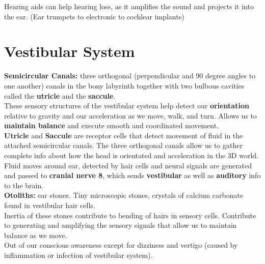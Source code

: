 \documentclass{article}
\begin{document}
Hearing aids can help hearing loss, as it amplifies the sound and projects it into the ear. (Ear trumpets to electronic to cochlear implants) \\ 

\newpage
\section{Vestibular System}

\textbf{Semicircular Canals:} three orthogonal (perpendicular and 90 degree angles to one another) canals in the bony labyrinth together with two bulbous cavities called the \textbf{utricle} and the \textbf{saccule}. \\

These sensory structures of the vestibular system help detect our \textbf{orientation} relative to gravity and our acceleration as we move, walk, and turn. Allows us to \textbf{maintain balance} and execute smooth and coordinated movement. \\

\noindent \textbf{Utricle} and \textbf{Saccule} are receptor cells that detect movement of fluid in the attached semicircular canals. The three orthogonal canals allow us to gather complete info about how the head is orientated and acceleration in the 3D world. Fluid moves around ear, detected by hair cells and neural signals are generated and passed to \textbf{cranial nerve 8}, which sends\textbf{ vestibular} as well as \textbf{auditory} info to the brain. \\

\noindent \textbf{Otoliths:} ear stones. Tiny microscopic stones, crystals of calcium carbonate found in vestibular hair cells.\\

Inertia of these stones contribute to bending of hairs in sensory cells. Contribute to generating and amplifying the sensory signals that allow us to maintain balance as we move. \\

Out of our conscious awareness except for dizziness and vertigo (caused by inflammation or infection of vestibular system). \\
\end{document}
